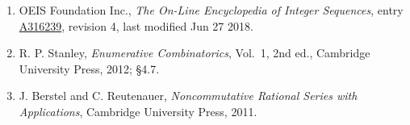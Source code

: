 \documentclass[11pt]{article}
\theoremstyle{definition}
\begin{document}
\begin{enumerate}

\item OEIS Foundation Inc., \emph{The On-Line Encyclopedia of Integer Sequences}, entry \href{https://oeis.org/A316239}{A316239}, revision 4, last modified Jun 27 2018.

\item R. P. Stanley, \emph{Enumerative Combinatorics}, Vol.~1, 2nd ed., Cambridge University Press, 2012; \S4.7.

\item J. Berstel and C. Reutenauer, \emph{Noncommutative Rational Series with Applications}, Cambridge University Press, 2011.

\end{enumerate}
\end{document}
